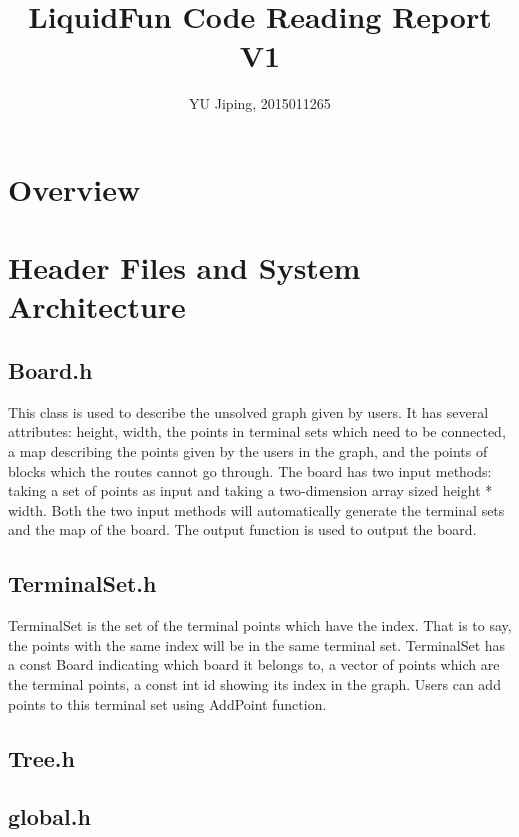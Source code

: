 \documentclass[12pt, a4paper]{article}
\title{LiquidFun Code Reading Report V1}
\author{YU Jiping, 2015011265}
\begin{document}
	\sloppypar

	\maketitle
	
	\tableofcontents
	\newpage
	
	\section{Overview}
	
	\section{Header Files and System Architecture}
	
		\subsection{Board.h}
		
			This class is used to describe the unsolved graph given by users. It has several attributes: height, width, the points in terminal sets which need to be connected, a map describing the points given by the users in the graph, and the points of blocks which the routes cannot go through. The board has two input methods: taking a set of points as input and taking a two-dimension array sized height * width. Both the two input methods will automatically generate the terminal sets and the map of the board. The output function is used to output the board.
		
		\subsection{TerminalSet.h}
		
			TerminalSet is the set of the terminal points which have the index. That is to say, the points with the same index will be in the same terminal set. TerminalSet has a const Board indicating which board it belongs to, a vector of points which are the terminal points, a const int id showing its index in the graph. Users can add points to this terminal set using AddPoint function.
				
		\subsection{Tree.h}
		
		\subsection{global.h}
		
\end{document}
